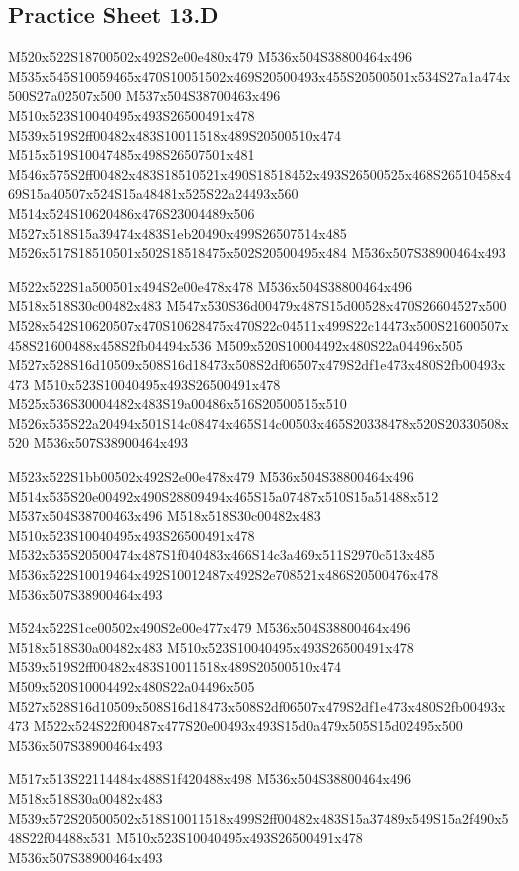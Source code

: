 \documentclass{article}
\begin{document}
\subsection{Practice Sheet 13.D}

\begin{multicols}{5}
\begin{center}

M520x522S18700502x492S2e00e480x479 %
M536x504S38800464x496 %
M535x545S10059465x470S10051502x469S20500493x455S20500501x534S27a1a474x500S27a02507x500 %
M537x504S38700463x496 %
M510x523S10040495x493S26500491x478 %
M539x519S2ff00482x483S10011518x489S20500510x474 %
M515x519S10047485x498S26507501x481 %
M546x575S2ff00482x483S18510521x490S18518452x493S26500525x468S26510458x469S15a40507x524S15a48481x525S22a24493x560 %
M514x524S10620486x476S23004489x506 %
M527x518S15a39474x483S1eb20490x499S26507514x485 %
M526x517S18510501x502S18518475x502S20500495x484 %
M536x507S38900464x493 %
\vfil
\columnbreak

M522x522S1a500501x494S2e00e478x478 %
M536x504S38800464x496 %
M518x518S30c00482x483 %
M547x530S36d00479x487S15d00528x470S26604527x500 %
M528x542S10620507x470S10628475x470S22c04511x499S22c14473x500S21600507x458S21600488x458S2fb04494x536 %
M509x520S10004492x480S22a04496x505 %
M527x528S16d10509x508S16d18473x508S2df06507x479S2df1e473x480S2fb00493x473 %
M510x523S10040495x493S26500491x478 %
M525x536S30004482x483S19a00486x516S20500515x510 %
M526x535S22a20494x501S14c08474x465S14c00503x465S20338478x520S20330508x520 %
M536x507S38900464x493 %
\vfil
\columnbreak

M523x522S1bb00502x492S2e00e478x479 %
M536x504S38800464x496 %
M514x535S20e00492x490S28809494x465S15a07487x510S15a51488x512 %
M537x504S38700463x496 %
M518x518S30c00482x483 %
M510x523S10040495x493S26500491x478 %
M532x535S20500474x487S1f040483x466S14c3a469x511S2970c513x485 %
M536x522S10019464x492S10012487x492S2e708521x486S20500476x478 %
M536x507S38900464x493 %
\vfil
\columnbreak

M524x522S1ce00502x490S2e00e477x479 %
M536x504S38800464x496 %
M518x518S30a00482x483 %
M510x523S10040495x493S26500491x478 %
M539x519S2ff00482x483S10011518x489S20500510x474 %
M509x520S10004492x480S22a04496x505 %
M527x528S16d10509x508S16d18473x508S2df06507x479S2df1e473x480S2fb00493x473 %
M522x524S22f00487x477S20e00493x493S15d0a479x505S15d02495x500 %
M536x507S38900464x493 %
\vfil
\columnbreak

M517x513S22114484x488S1f420488x498 %
M536x504S38800464x496 %
M518x518S30a00482x483 %
M539x572S20500502x518S10011518x499S2ff00482x483S15a37489x549S15a2f490x548S22f04488x531 %
M510x523S10040495x493S26500491x478 %
M536x507S38900464x493 %
\vfil

\end{center}
\end{multicols}
\end{document}
